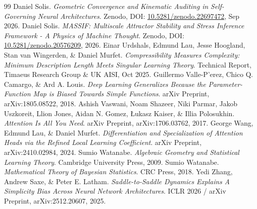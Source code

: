 \documentclass[11pt,twocolumn]{article}
\begin{document}
\begin{thebibliography}{99}
 Daniel Solis. \textit{Geometric Convergence and Kinematic Auditing in Self-Governing Neural Architectures}. Zenodo, DOI: \href{https://doi.org/10.5281/zenodo.22697472}{10.5281/zenodo.22697472}, Sep 2026.
 Daniel Solis. \textit{MASSIF: Multiscale Attractor Stability and Stress Inference Framework - A Physics of Machine Thought}. Zenodo, DOI: \href{https://doi.org/10.5281/zenodo.20576209}{10.5281/zenodo.20576209}, 2026.
 Einar Urdshals, Edmund Lau, Jesse Hoogland, Stan van Wingerden, \& Daniel Murfet. \textit{Compressibility Measures Complexity: Minimum Description Length Meets Singular Learning Theory}. Technical Report, Timaeus Research Group \& UK AISI, Oct 2025.
 Guillermo Valle-P'erez, Chico Q. Camargo, \& Ard A. Louis. \textit{Deep Learning Generalizes Because the Parameter-Function Map is Biased Towards Simple Functions}. arXiv Preprint, arXiv:1805.08522, 2018.
 Ashish Vaswani, Noam Shazeer, Niki Parmar, Jakob Uszkoreit, Llion Jones, Aidan N. Gomez, {\L}ukasz Kaiser, \& Illia Polosukhin. \textit{Attention Is All You Need}. arXiv Preprint, arXiv:1706.03762, 2017.
 George Wang, Edmund Lau, \& Daniel Murfet. \textit{Differentiation and Specialization of Attention Heads via the Refined Local Learning Coefficient}. arXiv Preprint, arXiv:2410.02984, 2024.
 Sumio Watanabe. \textit{Algebraic Geometry and Statistical Learning Theory}. Cambridge University Press, 2009.
 Sumio Watanabe. \textit{Mathematical Theory of Bayesian Statistics}. CRC Press, 2018.
 Yedi Zhang, Andrew Saxe, \& Peter E. Latham. \textit{Saddle-to-Saddle Dynamics Explains A Simplicity Bias Across Neural Network Architectures}. ICLR 2026 / arXiv Preprint, arXiv:2512.20607, 2025.
\end{thebibliography}
\end{document}
